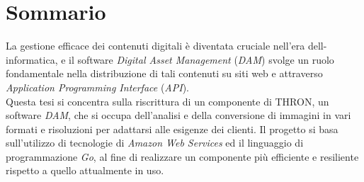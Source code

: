 \cleardoublepage
{}
{}
\begingroup
\let\clearpage\relax
\let\cleardoublepage\relax
\let\cleardoublepage\relax

\chapter*{Sommario}

La gestione efficace dei contenuti digitali è diventata cruciale nell'era dell-informatica, e il software \textit{Digital Asset Management} (\textit{DAM}) svolge un ruolo
fondamentale nella distribuzione di tali contenuti su siti web e attraverso
\textit{Application Programming Interface} (\textit{API}). \\
Questa tesi si concentra sulla riscrittura di un componente di THRON, un
software \textit{DAM}, che si occupa dell'analisi e della conversione di immagini in vari
formati e risoluzioni per adattarsi alle esigenze dei clienti.
Il progetto si basa sull'utilizzo di tecnologie di \textit{Amazon Web Services} ed il
linguaggio di programmazione \textit{Go},
al fine di realizzare un componente più efficiente e resiliente rispetto a quello attualmente in uso.



\endgroup

\vfill
